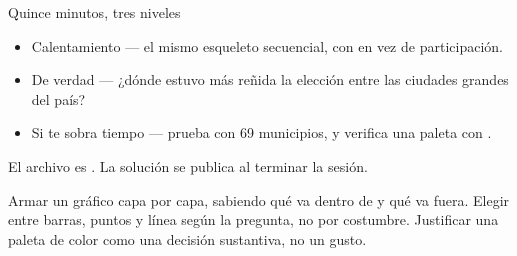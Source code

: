 \begin{frame}{Quince minutos, tres niveles}
  \vspace{0.4em}
  \begin{itemize}\setlength{\itemsep}{1.0em}
    \item \ac{Calentamiento} — el mismo esqueleto secuencial, con
           en vez de participación.
    \item \ac{De verdad} — ¿dónde estuvo más reñida la elección entre
          las ciudades grandes del país?
    \item \ac{Si te sobra tiempo} — prueba  con 69
          municipios, y verifica una paleta con .
  \end{itemize}

  \vspace{1.2em}
  {\small\color{grisTenue}El archivo es . La
  solución se publica al terminar la sesión.}
\end{frame}

\yasabemos
  {Armar un gráfico capa por capa, sabiendo qué va dentro de  y qué va fuera.}
  {Elegir entre barras, puntos y línea según la pregunta, no por costumbre.}
  {Justificar una paleta de color como una decisión sustantiva, no un gusto.}



